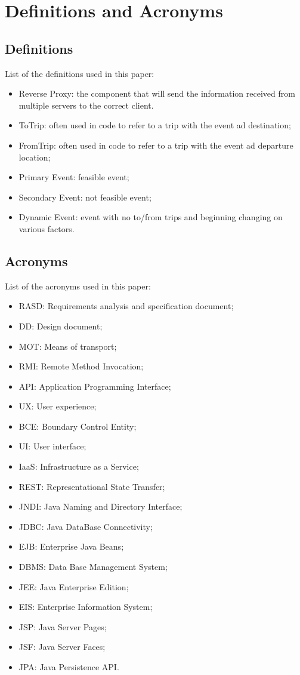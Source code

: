 \section{Definitions and Acronyms}
%
\subsection{Definitions}
List of the definitions used in this paper:
\begin{itemize}
\item	Reverse Proxy: the component that will send the information received from multiple servers to the correct client.
\item	ToTrip: often used in code to refer to a trip with the event ad destination;
\item	FromTrip: often used in code to refer to a trip with the event ad departure location;
\item	Primary Event: feasible event;
\item	Secondary Event: not feasible event;
\item	Dynamic Event: event with no to/from trips and beginning changing on various factors.
\end{itemize}

\subsection{Acronyms}
List of the acronyms used in this paper:
\begin{itemize}
\item	RASD: Requirements analysis and specification document;
\item	DD: Design document;
\item	MOT: Means of transport;
\item	RMI: Remote Method Invocation;
\item	API: Application Programming Interface;
\item	UX: User experience;
\item	BCE: Boundary Control Entity;
\item	UI: User interface;
\item	IaaS: Infrastructure as a Service;
\item	REST: Representational State Transfer;
\item	JNDI: Java Naming and Directory Interface;
\item	JDBC: Java DataBase Connectivity;
\item	EJB: Enterprise Java Beans;
\item	DBMS: Data Base Management System;
\item	JEE: Java Enterprise Edition;
\item	EIS: Enterprise Information System;
\item	JSP: Java Server Pages;
\item	JSF: Java Server Faces;
\item	JPA: Java Persistence API.

\end{itemize}
%
%

